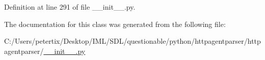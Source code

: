 Definition at line 291 of file \+\_\+\+\_\+init\+\_\+\+\_\+.\+py.



The documentation for this class was generated from the following file\+:\begin{DoxyCompactItemize}
\item 
C\+:/\+Users/petertix/\+Desktop/\+I\+M\+L/\+S\+D\+L/questionable/python/httpagentparser/httpagentparser/\hyperlink{____init_____8py}{\+\_\+\+\_\+init\+\_\+\+\_\+.\+py}\end{DoxyCompactItemize}

